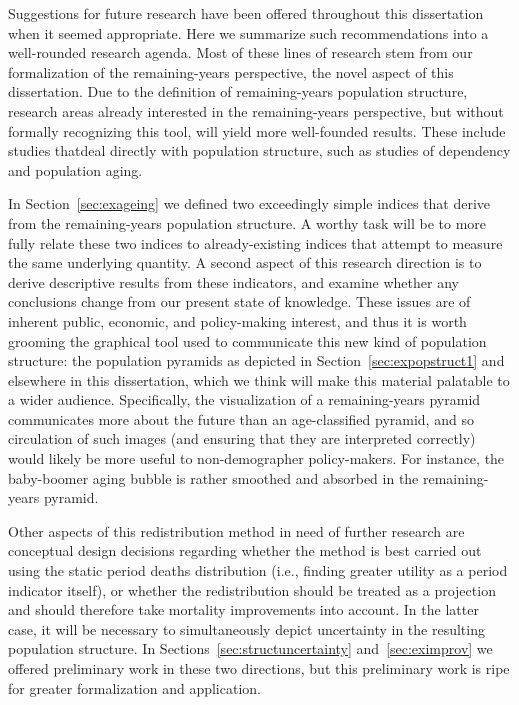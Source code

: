 Suggestions for future research have been offered throughout this dissertation
when it seemed appropriate. Here we summarize such recommendations into a
well-rounded research agenda. Most of these lines of research stem
from our formalization of the remaining-years perspective, the novel aspect of
this dissertation. Due to the definition of remaining-years population
structure, research areas already interested in the remaining-years perspective,
but without formally recognizing this tool, will yield more well-founded
results. These include studies thatdeal directly with
population structure, such as studies of dependency and population aging. 

In Section~\ref{sec:exageing} we defined two exceedingly simple indices
that derive from the remaining-years population structure. A worthy task will
be to more fully relate these two indices to already-existing indices that
attempt to measure the same underlying quantity. A second aspect of this
research direction is to derive descriptive results from these indicators,
and examine whether any conclusions change from our present state of knowledge.
These issues are of inherent public, economic, and policy-making interest,
and thus it is worth grooming the graphical tool used to communicate this new
kind of population structure: the population pyramids as depicted in
Section~\ref{sec:expopstruct1} and elsewhere in this dissertation, which we
think will make this material palatable to a wider audience. Specifically, the
visualization of a remaining-years pyramid communicates more about the future
than an age-classified pyramid, and so circulation of such images (and ensuring
that they are interpreted correctly) would likely be more useful to
non-demographer policy-makers. For instance, the baby-boomer aging bubble is rather smoothed and
absorbed in the remaining-years pyramid. 

Other aspects of this redistribution method in need of further research are
conceptual design decisions regarding whether the method is best carried out
using the static period deaths distribution (i.e., finding greater utility as a
period indicator itself), or whether the redistribution should be treated as a
 projection and should therefore take mortality improvements into account.
In the latter case, it will be necessary to simultaneously depict uncertainty in
the resulting population structure. In
Sections~\ref{sec:structuncertainty} and~\ref{sec:eximprov} we offered
preliminary work in these two directions, but this preliminary work is ripe for
greater formalization and application.

